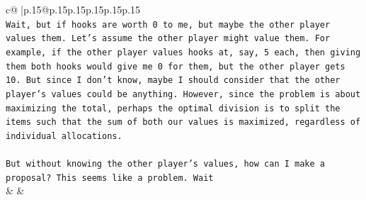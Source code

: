\documentclass{article}
\begin{document}
{\begin{supertabular}{c@{$\;$}|p{.15\linewidth}@{}p{.15\linewidth}p{.15\linewidth}p{.15\linewidth}p{.15\linewidth}p{.15\linewidth}}
{{{\\ 
\texttt{Wait, but if hooks are worth 0 to me, but maybe the other player values them. Let's assume the other player might value them. For example, if the other player values hooks at, say, 5 each, then giving them both hooks would give me 0 for them, but the other player gets 10. But since I don't know, maybe I should consider that the other player's values could be anything. However, since the problem is about maximizing the total, perhaps the optimal division is to split the items such that the sum of both our values is maximized, regardless of individual allocations.} \\
\\ 
\texttt{But without knowing the other player's values, how can I make a proposal? This seems like a problem. Wait} \\
            }
        }
    }
    & & \\ \\


\end{supertabular}}
\end{document}

